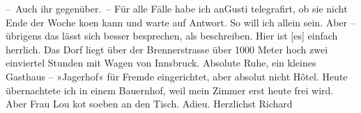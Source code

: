 \begin{ledgroupsized}[t]{13cm}
           \pstart
           – Auch ihr gegenüber. –\pend
           \pstart
           Für alle Fälle habe ich \introOben{}an\introOben{}{ }Gusti telegrafirt, ob sie nicht
               Ende der Woche ko{\geminationm}en kann und warte auf Antwort. So will
               ich allein sein. Aber – übrigens das lässt sich besser besprechen, als beschreiben.
               Hier ist {\pb}{[}es{]} einfach herrlich. Das Dorf liegt über der Brennerstrasse über 1000 Meter hoch zwei einviertel Stunden mit
               Wagen von Innsbruck. Absolute Ruhe, ein kleines
               Gasthaus – »Jagerhof« für Fremde eingerichtet,
               aber absolut nicht Hôtel. Heute übernachtete ich in einem Bauernhof, weil mein Zimmer
               erst heute frei wird. Aber Frau Lou ko{\geminationm}t soeben an den Tisch. Adieu.\pend
           \pstart Herzlichst \spacefill\mbox{Richard}\pend{}
         
         \endnumbering{}\end{ledgroupsized}  \newcommand{\dateiname}{L00480}\newcommand{\titel}{Richard Beer-Hofmann an Arthur Schnitzler, 10. 9. 1895}\newcommand{\editorInnen}{Martin Anton Müller und Gerd-Hermann Susen}
      